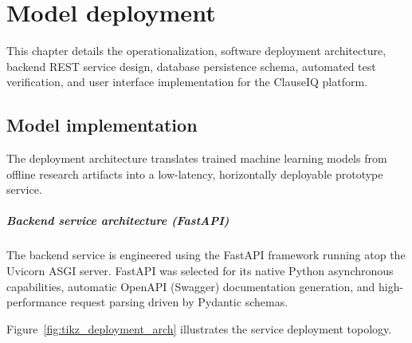 \chapter{Model deployment}
\label{ch:model_deployment}

This chapter details the operationalization, software deployment architecture, backend REST service design, database persistence schema, automated test verification, and user interface implementation for the ClauseIQ platform.

\section{Model implementation}
\label{sec:model_implementation}

The deployment architecture translates trained machine learning models from offline research artifacts into a low-latency, horizontally deployable prototype service.

\paragraph*{Backend service architecture (FastAPI)}
The backend service is engineered using the FastAPI framework running atop the Uvicorn ASGI server. FastAPI was selected for its native Python asynchronous capabilities, automatic OpenAPI (Swagger) documentation generation, and high-performance request parsing driven by Pydantic schemas.

Figure~\ref{fig:tikz_deployment_arch} illustrates the service deployment topology.

